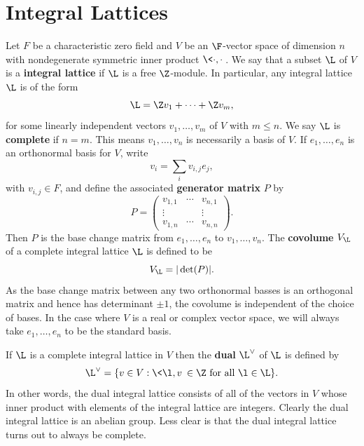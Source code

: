   \chapter{Integral Lattices}\label{ch:integral_lattices}
    Let \(F\) be a characteristic zero field and \(V\) be an \(\F\)-vector space of dimension \(n\) with nondegenerate symmetric inner product \(\<\cdot,\cdot\>\). We say that a subset \(\L\) of \(V\) is a \textbf{integral lattice} if \(\L\) is a free \(\Z\)-module. In particular, any integral lattice \(\L\) is of the form
    \[
      \L = \Z v_{1}+\cdots+\Z v_{m},
    \]
    for some linearly independent vectors \(v_{1},\ldots,v_{m}\) of \(V\) with \(m \le n\). We say \(\L\) is \textbf{complete} if \(n = m\). This means \(v_{1},\ldots,v_{n}\) is necessarily a basis of \(V\). If \(e_{1},\ldots,e_{n}\) is an orthonormal basis for \(V\), write
    \[
      v_{i} = \sum_{i}v_{i,j}e_{j},
    \]
    with \(v_{i,j} \in F\), and define the associated \textbf{generator matrix} \(P\) by
    \[
      P = \begin{pmatrix} v_{1,1} & \cdots & v_{n,1} \\ \vdots & & \vdots \\ v_{1,n} & \cdots & v_{n,n} \end{pmatrix}.
    \]
    Then \(P\) is the base change matrix from \(e_{1},\ldots,e_{n}\) to \(v_{1},\ldots,v_{n}\). The \textbf{covolume} \(V_{\L}\) of a complete integral lattice \(\L\) is defined to be
    \[
      V_{\L} = |\det(P)|.
    \]
    As the base change matrix between any two orthonormal basses is an orthogonal matrix and hence has determinant \(\pm 1\), the covolume is independent of the choice of bases. In the case where \(V\) is a real or complex vector space, we will always take \(e_{1},\ldots,e_{n}\) to be the standard basis.
    
    If \(\L\) is a complete integral lattice in \(V\) then the \textbf{dual} \(\L^{\vee}\) of \(\L\) is defined by
    \[
      \L^{\vee} = \{v \in V:\<\l,v\> \in \Z \text{ for all } \l \in \L\}.
    \]
    In other words, the dual integral lattice consists of all of the vectors in \(V\) whose inner product with elements of the integral lattice are integers. Clearly the dual integral lattice is an abelian group. Less clear is that the dual integral lattice turns out to always be complete.

